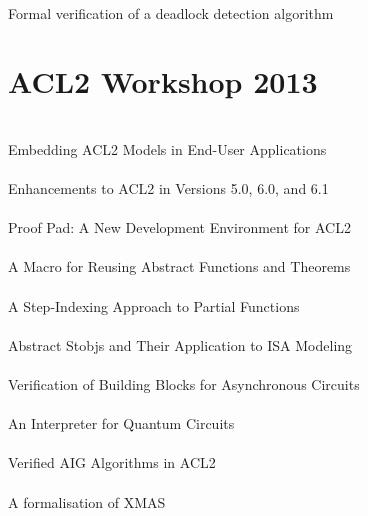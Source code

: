 \documentclass{article}
\begin{document}
\cite{11-verbeek-deadlock} \\
Formal verification of a deadlock detection algorithm \\


\section{ACL2 Workshop 2013}

\cite{13-davis-embedding} \\
Embedding {ACL2} Models in End-User Applications \\

\cite{13-kaufmann-enhancements} \\
Enhancements to {ACL2} in Versions 5.0, 6.0, and 6.1 \\

\cite{13-eggensperger} \\
{Proof Pad}: A New Development Environment for {ACL2} \\

\cite{13-joosten} \\
A Macro for Reusing Abstract Functions and Theorems \\

\cite{13-greve-partial} \\
A Step-Indexing Approach to Partial Functions \\

\cite{13-goel-absstobj} \\
Abstract Stobjs and Their Application to {ISA} Modeling \\

\cite{13-verbeek-async} \\
Verification of Building Blocks for Asynchronous Circuits \\

\cite{13-helms-quantum} \\
An Interpreter for Quantum Circuits \\

\cite{13-davis-aig} \\
Verified {AIG} Algorithms in {ACL2} \\

\cite{13-van-gastel-xmas} \\
A formalisation of {XMAS} \\
\end{document}
